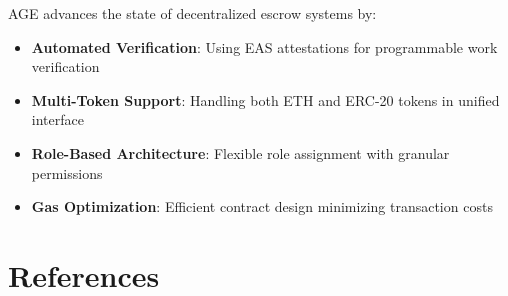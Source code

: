 \documentclass[12pt,a4paper]{article}
\begin{document}
AGE advances the state of decentralized escrow systems by:
\begin{itemize}
    \item \textbf{Automated Verification}: Using EAS attestations for programmable work verification
    \item \textbf{Multi-Token Support}: Handling both ETH and ERC-20 tokens in unified interface
    \item \textbf{Role-Based Architecture}: Flexible role assignment with granular permissions
    \item \textbf{Gas Optimization}: Efficient contract design minimizing transaction costs
\end{itemize}


\section{References}
\end{document}
